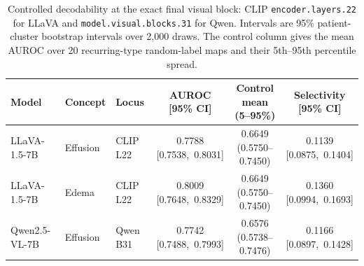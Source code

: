 \begin{table}[t]
\centering
\footnotesize
\setlength{\tabcolsep}{2.5pt}
\caption{Controlled decodability at the exact final visual block: CLIP \texttt{encoder.layers.22} for LLaVA and \texttt{model.visual.blocks.31} for Qwen. Intervals are 95\% patient-cluster bootstrap intervals over 2,000 draws. The control column gives the mean AUROC over 20 recurring-type random-label maps and their 5th--95th percentile spread.}
\label{tab:decoding}
\begin{tabular*}{\textwidth}{@{\extracolsep{\fill}}lllccc@{}}
\toprule
Model & Concept & Locus & \shortstack{AUROC \\ {[95\% CI]}} & \shortstack{Control mean \\ {(5--95\%)}} & \shortstack{Selectivity \\ {[95\% CI]}} \\
\midrule
LLaVA-1.5-7B & Effusion & CLIP L22 & \shortstack{0.7788 \\ \mbox{[0.7538, 0.8031]}} & \shortstack{0.6649 \\ \mbox{(0.5750--0.7450)}} & \shortstack{0.1139 \\ \mbox{[0.0875, 0.1404]}} \\
LLaVA-1.5-7B & Edema & CLIP L22 & \shortstack{0.8009 \\ \mbox{[0.7648, 0.8329]}} & \shortstack{0.6649 \\ \mbox{(0.5750--0.7450)}} & \shortstack{0.1360 \\ \mbox{[0.0994, 0.1693]}} \\
Qwen2.5-VL-7B & Effusion & Qwen B31 & \shortstack{0.7742 \\ \mbox{[0.7488, 0.7993]}} & \shortstack{0.6576 \\ \mbox{(0.5738--0.7476)}} & \shortstack{0.1166 \\ \mbox{[0.0897, 0.1428]}} \\
\bottomrule
\end{tabular*}
\end{table}
